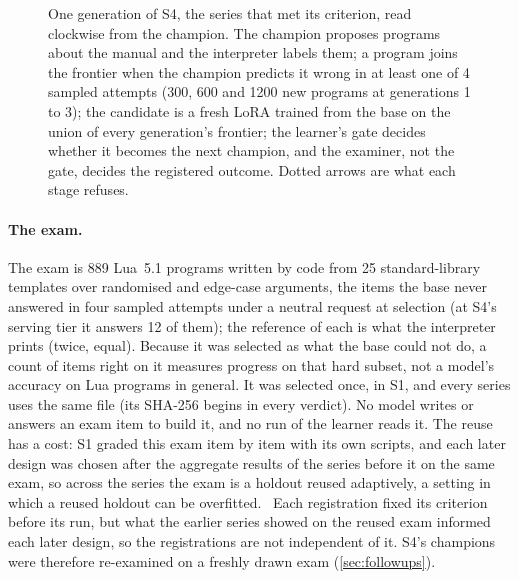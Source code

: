 \begin{figure}[tbp]
\caption{One generation of S4, the series that met its criterion, read clockwise from the champion. The champion proposes programs about
the manual and the interpreter labels them; a program joins the frontier when the champion predicts it
wrong in at least one of 4 sampled attempts (300, 600 and 1200 new programs at generations 1 to 3); the
candidate is a fresh LoRA trained from the base on the union of every generation's frontier; the
learner's gate decides whether it becomes the next champion, and the examiner, not the gate, decides
the registered outcome. Dotted arrows are what each stage refuses.}\label{fig:cycle}
\end{figure}

\paragraph{The exam.} The exam is 889 Lua~5.1 programs written by code from 25 standard-library
templates over randomised and edge-case arguments, the items the base never answered in four sampled
attempts under a neutral request at selection (at S4's serving tier it answers 12 of them); the reference of each is what the interpreter prints (twice,
equal). Because it was selected as what the base could not do, a count of items right on it
measures progress on that hard subset, not a model's accuracy on Lua programs in general. It was
selected once, in S1, and every series uses the same file (its SHA-256 begins
 in every verdict). No model writes or answers an exam item to build
it, and no run of the learner reads it. The reuse has a cost: S1 graded this exam item by item with
its own scripts, and each later design was chosen after the aggregate results of the series before it
on the same exam, so across the series the exam is a holdout reused adaptively, a setting in which a
reused holdout can be overfitted.~\citep{holdout2015} Each registration fixed its criterion before
its run, but what the earlier series showed on the reused exam informed each later design, so the
registrations are not independent of it. S4's champions were therefore re-examined on a freshly drawn
exam (\cref{sec:followups}).

